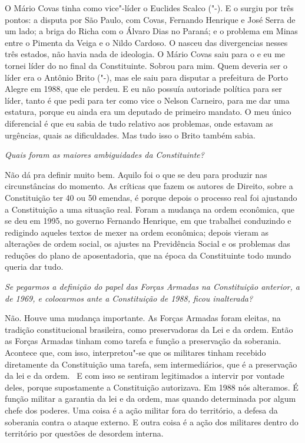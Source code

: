 O Mário Covas tinha como vice"-líder o Euclides Scalco ("-). E o
 surgiu por três pontos: a disputa por São Paulo, com Covas,
Fernando Henrique e José Serra de um lado; a briga do Richa com o Álvaro
Dias no Paraná; e o problema em Minas entre o Pimenta da Veiga e o Nildo
Cardoso. O  nasceu das divergencias nesses três estados, não havia
nada de ideologia. O Mário Covas saiu para o  e eu me tornei líder
do  no final da Constituinte. Sobrou para mim. Quem deveria ser o
líder era o Antônio Brito ("-), mas ele saiu para disputar a
prefeitura de Porto Alegre em 1988, que ele perdeu. E eu não possuía
autoriade política para ser líder, tanto é que pedi para ter como vice o
Nelson Carneiro, para me dar uma estatura, porque eu ainda era um
deputado de primeiro mandato. O meu único diferencial é que eu sabia de
tudo relativo aos problemas, onde estavam as urgências, quais as
dificuldades. Mas tudo isso o Brito também sabia.

\medskip

\emph{Quais foram as maiores ambiguidades da Constituinte?}

Não dá pra definir muito bem. Aquilo foi o que se deu
para produzir nas circunstâncias do momento. As críticas que fazem os
autores de Direito, sobre a Constituição ter 40 ou 50 emendas, é porque
depois o processo real foi ajustando a Constituição a uma situação real.
Foram a mudança na ordem econômica, que se deu em 1995, no governo
Fernando Henrique, em que trabalhei conduzindo e redigindo aqueles
textos de mexer na ordem econômica; depois vieram as alterações de ordem
social, os ajustes na Previdência Social e os problemas das reduções do
plano de aposentadoria, que na época da Constituinte todo mundo queria
dar tudo.

\medskip

\emph{Se pegarmos a definição do papel das Forças Armadas na Constituição
anterior, a de 1969, e colocarmos ante a Constituição de 1988, ficou
inalterada?}

Não. Houve uma mudança importante. As Forças Armadas
foram eleitas, na tradição constitucional brasileira, como preservadoras
da Lei e da ordem. Então as Forças Armadas tinham como tarefa e função a
preservação da soberania. Acontece que, com isso, interpretou"-se que os
militares tinham recebido diretamente da Constituição uma tarefa, sem
intermediários, que é a preservação da lei e da ordem.~ E com isso se
sentiram legitimados a intervir por vontade deles, porque supostamente a
Constituição autorizava. Em 1988 nós alteramos. É função militar a
garantia da lei e da ordem, mas quando determinada por algum chefe dos
poderes. Uma coisa é a ação militar fora do território, a defesa da
soberania contra o ataque externo. E outra coisa é a ação dos militares
dentro do território por questões de desordem interna.

